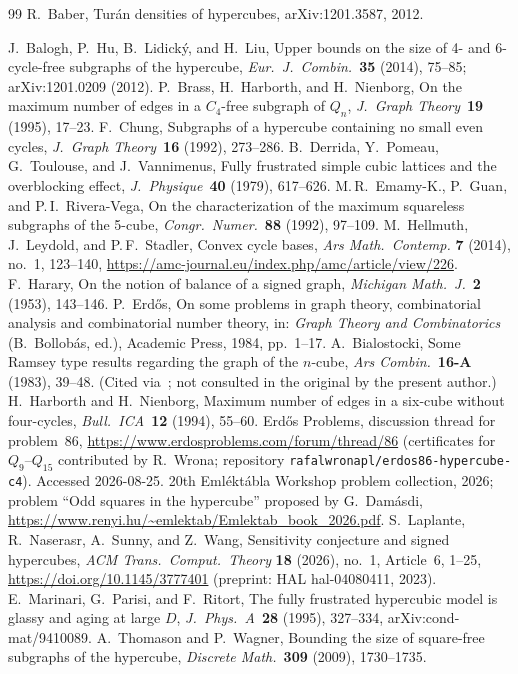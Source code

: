 \documentclass[12pt]{article}
\begin{document}
\begin{thebibliography}{99}
R.~Baber,
Tur\'an densities of hypercubes,
arXiv:1201.3587, 2012.

 J.~Balogh, P.~Hu, B.~Lidick\'y, and H.~Liu, Upper bounds on
  the size of 4- and 6-cycle-free subgraphs of the hypercube,
  \textit{Eur.\ J.\ Combin.}\ \textbf{35} (2014), 75--85; arXiv:1201.0209 (2012).
 P.~Brass, H.~Harborth, and H.~Nienborg, On the maximum number
  of edges in a $C_4$-free subgraph of $Q_n$,
  \textit{J.\ Graph Theory}\ \textbf{19} (1995), 17--23.
 F.~Chung, Subgraphs of a hypercube containing no small even
  cycles, \textit{J.\ Graph Theory}\ \textbf{16} (1992), 273--286.
 B.~Derrida, Y.~Pomeau, G.~Toulouse, and J.~Vannimenus,
  Fully frustrated simple cubic lattices and the overblocking effect,
  \textit{J.\ Physique}\ \textbf{40} (1979), 617--626.
 M.\,R.~Emamy-K., P.~Guan, and P.\,I.~Rivera-Vega, On the
  characterization of the maximum squareless subgraphs of the 5-cube,
  \textit{Congr.\ Numer.}\ \textbf{88} (1992), 97--109.
 M.~Hellmuth, J.~Leydold, and P.\,F.~Stadler, Convex cycle
  bases, \textit{Ars Math.\ Contemp.} \textbf{7} (2014), no.~1, 123--140,
  \url{https://amc-journal.eu/index.php/amc/article/view/226}.
 F.~Harary, On the notion of balance of a signed graph,
  \textit{Michigan Math.\ J.}\ \textbf{2} (1953), 143--146.
 P.~Erd\H{o}s, On some problems in graph theory, combinatorial
  analysis and combinatorial number theory, in: \textit{Graph Theory and
  Combinatorics} (B.~Bollob\'as, ed.), Academic Press, 1984, pp.~1--17.
 A.~Bialostocki, Some Ramsey type results regarding the graph
  of the $n$-cube, \textit{Ars Combin.}\ \textbf{16-A} (1983), 39--48. (Cited
  via~\cite{LNSW26}; not consulted in the original by the present author.)
 H.~Harborth and H.~Nienborg, Maximum number of edges in a
  six-cube without four-cycles, \textit{Bull.\ ICA}\ \textbf{12} (1994), 55--60.
 Erd\H{o}s Problems, discussion thread for problem~86,
  \url{https://www.erdosproblems.com/forum/thread/86}
  (certificates for $Q_9$--$Q_{15}$ contributed by R.~Wrona; repository
  \texttt{rafalwronapl/erdos86-hypercube-c4}). Accessed 2026-08-25.
 20th Emléktábla Workshop problem collection, 2026;
  problem ``Odd squares in the hypercube'' proposed by G.~Dam\'asdi,
  \url{https://www.renyi.hu/~emlektab/Emlektab_book_2026.pdf}.
 S.~Laplante, R.~Naserasr, A.~Sunny, and Z.~Wang,
  Sensitivity conjecture and signed hypercubes,
  \textit{ACM Trans.\ Comput.\ Theory} \textbf{18} (2026), no.~1, Article~6, 1--25,
  \url{https://doi.org/10.1145/3777401}
  (preprint: HAL hal-04080411, 2023).
 E.~Marinari, G.~Parisi, and F.~Ritort, The fully frustrated
  hypercubic model is glassy and aging at large $D$,
  \textit{J.\ Phys.\ A}\ \textbf{28} (1995), 327--334, arXiv:cond-mat/9410089.
 A.~Thomason and P.~Wagner, Bounding the size of square-free
  subgraphs of the hypercube, \textit{Discrete Math.}\ \textbf{309} (2009),
  1730--1735.
\end{thebibliography}
\end{document}
